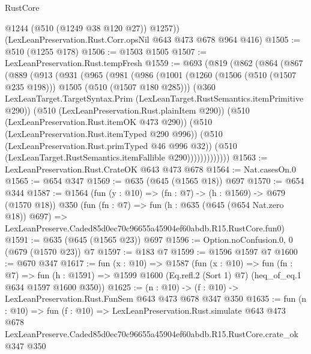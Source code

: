\begin{lexlean}{RustCore}
\begin{coremodule}
        @1244
        (@510 (@1249 @38 @120 @27))
        @1257))
    (LexLeanPreservation.Rust.Corr.opsNil @643 @473 @678 @964 @416)
@1505 := @510 (@1255 @178)
@1506 := @1503 @1505
@1507 := LexLeanPreservation.Rust.tempFresh
@1559 := @693
    (@819
      (@862
        (@864
          (@867
            (@889
              (@913
                (@931
                  (@965
                    (@981
                      (@986
                        (@1001
                          (@1260 (@1506 (@510 (@1507 @235 @198))) @1505 (@510 (@1507 @180 @285)))
                          (@360
                            LexLeanTarget.TargetSyntax.Prim
                            (LexLeanTarget.RustSemantics.itemPrimitive @290))
                          (@510 (LexLeanPreservation.Rust.plainItem @290))
                          (@510 (LexLeanPreservation.Rust.itemOK @473 @290))
                          (@510 (LexLeanPreservation.Rust.itemTyped @290 @996))
                          (@510 (LexLeanPreservation.Rust.primTyped @46 @996 @32))
                          (@510 (LexLeanTarget.RustSemantics.itemFallible @290)))))))))))))
@1563 := LexLeanPreservation.Rust.CrateOK @643 @473 @678
@1564 := Nat.casesOn.{0}
@1565 := @654 @347
@1569 := @635 (@645 (@1565 @18)) @697
@1570 := @654 @344
@1587 := @1564
    (fun (y : @10) => (fn : @7) -> (h : @1569) -> @679 (@1570 @18))
    @350
    (fun (fn : @7) =>
    fun (h : @635 (@645 (@654 Nat.zero @18)) @697) =>
    LexLeanPreserve.Caded85d0ec70c96655a45904ef60abdb.R15.RustCore.fun0)
@1591 := @635 (@645 (@1565 @23)) @697
@1596 := Option.noConfusion.{0, 0} (@679 (@1570 @23)) @7
@1597 := @183 @7
@1599 := @1596 @1597 @7
@1600 := @670 @347
@1617 := fun (x : @10) =>
  @1587
    (fun (x : @10) =>
    fun (fn : @7) =>
    fun (h : @1591) => @1599 @1600 (Eq.refl.{2} (Sort 1) @7) (heq_of_eq.{1} @634 @1597 @1600 @350))
@1625 := (n : @10) -> (f : @10) -> LexLeanPreservation.Rust.FunSem @643 @473 @678 @347 @350
@1635 := fun (n : @10) =>
  fun (f : @10) =>
  LexLeanPreservation.Rust.simulate
    @643
    @473
    @678
    LexLeanPreserve.Caded85d0ec70c96655a45904ef60abdb.R15.RustCore.crate_ok
    @347
    @350
\end{coremodule}
\end{lexlean}
